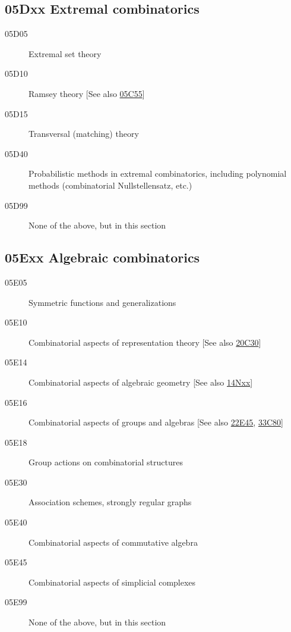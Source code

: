 \documentclass[letterpaper]{article}
\begin{document}
\subsection*{05Dxx  Extremal combinatorics }\label{05Dxx}
\begin{description}  
\item [05D05]\label{05D05} Extremal set theory
\item [05D10]\label{05D10} Ramsey theory [See also \hyperref[05C55]{05C55}]
\item [05D15]\label{05D15} Transversal (matching) theory
\item [05D40]\label{05D40} Probabilistic methods in extremal combinatorics, including polynomial methods (combinatorial Nullstellensatz, etc.)
\item [05D99]\label{05D99} None of the above, but in this section
\end{description}
\subsection*{05Exx  Algebraic combinatorics }\label{05Exx}
\begin{description}  
\item [05E05]\label{05E05} Symmetric functions and generalizations
\item [05E10]\label{05E10} Combinatorial aspects of representation theory [See also \hyperref[20C30]{20C30}]
\item [05E14]\label{05E14} Combinatorial aspects of algebraic geometry [See also \hyperref[14Nxx]{14Nxx}]
\item [05E16]\label{05E16} Combinatorial aspects of groups and algebras [See also \hyperref[22E45]{22E45}, \hyperref[33C80]{33C80}]
\item [05E18]\label{05E18} Group actions on combinatorial structures
\item [05E30]\label{05E30} Association schemes, strongly regular graphs
\item [05E40]\label{05E40} Combinatorial aspects of commutative algebra
\item [05E45]\label{05E45} Combinatorial aspects of simplicial complexes
\item [05E99]\label{05E99} None of the above, but in this section
\end{description}
\end{document}
